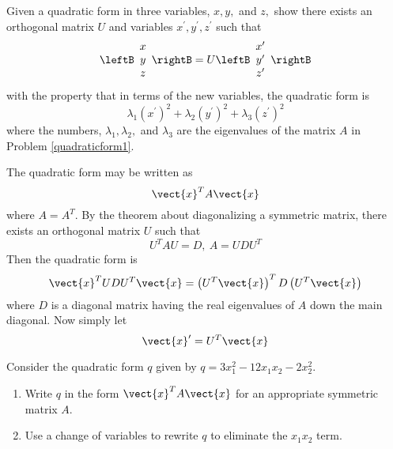 \begin{enumialphparenastyle}
\begin{ex} Given a quadratic form in three variables, $x,y,$ and $z,$ show there
exists an orthogonal matrix $U$ and variables $x^{\prime },y^{\prime
},z^{\prime }$ such that 
\begin{equation*}
\leftB
\begin{array}{c}
x \\ 
y \\ 
z
\end{array}
\rightB =U\leftB 
\begin{array}{c}
x^{\prime } \\ 
y^{\prime } \\ 
z^{\prime }
\end{array}
\rightB
\end{equation*}
with the property that in terms of the new variables, the quadratic form is 
\begin{equation*}
\lambda _{1}\left( x^{\prime }\right) ^{2}+\lambda _{2}\left( y^{\prime
}\right) ^{2}+\lambda _{3}\left( z^{\prime }\right) ^{2}
\end{equation*}
where the numbers, $\lambda _{1},\lambda _{2},$ and $\lambda _{3}$ are the
eigenvalues of the matrix $A$ in Problem \ref{quadraticform1}. 
\begin{sol}
The quadratic form
may be written as
\[
\vect{x}^{T}A\vect{x}
\]
where $A=A^{T}$. By the theorem about diagonalizing a symmetric matrix,
there exists an orthogonal matrix $U$ such that
\[
U^{T}AU=D,\ A=UDU^{T}
\]
Then the quadratic form is
\[
\vect{x}^{T}UDU^{T}\vect{x}=\left( U^{T}\vect{x}\right) ^{T}D\left(
U^{T}\vect{x}\right)
\]
where $D$ is a diagonal matrix having the real eigenvalues of $A$ down the
main diagonal. Now simply let
\[
\vect{x}^{\prime } =  U^{T}\vect{x}
\]
\end{sol}
\end{ex}

\begin{ex} Consider the quadratic form $q$ given by $q = 3x_1^2 -12x_1x_2 - 2x_2^2$.\begin{enumerate}
\item Write $q$ in the form $\vect{x}^TA\vect{x}$ for an appropriate symmetric matrix $A$.
\item Use a change of variables to rewrite $q$ to eliminate the $x_1x_2$ term. 
\end{enumerate}
\end{ex}


\end{enumialphparenastyle}
